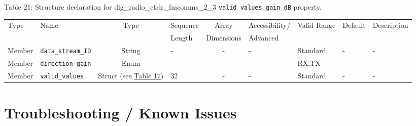 \documentclass{article}
\def\comp{dig\_radio\_ctrlr\_fmcomms\_2\_3}
\begin{document}
\begin{landscape}
	\noindent Table \hypertarget{tab21}{21}: Structure declaration for \comp{} \verb+valid_values_gain_dB+ property.
	\begin{scriptsize}
		\noindent\begin{longtable}{|p{1.8cm}|p{3.6cm}|c|p{2cm}|c|p{2cm}|p{1.7cm}|p{0.8cm}|p{4.97cm}|}
			\hline
			\rowcolor{blue}
			Type         & Name                                & Type & Sequence & Array      & Accessibility/ & Valid Range  & Default & Description                                                                                                                                                                                                                       \\
			\rowcolor{blue}
			             &                                     &      & Length   & Dimensions & Advanced       &              &         &                                                                                                                                                                                                                             \\
			\hline
			Member       & \verb+data_stream_ID+               & String& -       & -          & -              & Standard     & -       & - \\
			\hline
			Member       & \verb+direction_gain+               & Enum  & -       & -          & -              & RX,TX        & -       & - \\
			\hline
			Member       & \verb+valid_values+                 & Struct (see \hyperlink{tab17}{Table 17}) & 32      & -          & -              & Standard & -       & - \\
			\hline
		\end{longtable}
	\end{scriptsize}

\end{landscape}

\section{Troubleshooting / Known Issues}
\end{document}
